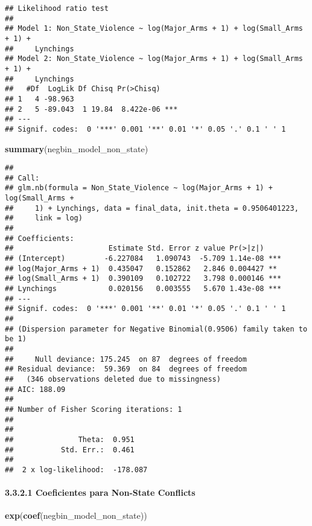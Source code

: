 \documentclass[
  11pt,
]{article}
\newenvironment{Shaded}{\begin{snugshade}}{\end{snugshade}}
\newcommand{\FunctionTok}[1]{\textcolor[rgb]{0.13,0.29,0.53}{\textbf{#1}}}
\newcommand{\NormalTok}[1]{#1}
\begin{document}
\begin{verbatim}
## Likelihood ratio test
## 
## Model 1: Non_State_Violence ~ log(Major_Arms + 1) + log(Small_Arms + 1) + 
##     Lynchings
## Model 2: Non_State_Violence ~ log(Major_Arms + 1) + log(Small_Arms + 1) + 
##     Lynchings
##   #Df  LogLik Df Chisq Pr(>Chisq)    
## 1   4 -98.963                        
## 2   5 -89.043  1 19.84  8.422e-06 ***
## ---
## Signif. codes:  0 '***' 0.001 '**' 0.01 '*' 0.05 '.' 0.1 ' ' 1
\end{verbatim}

\begin{Shaded}
\begin{Highlighting}[]
\FunctionTok{summary}\NormalTok{(negbin\_model\_non\_state)}
\end{Highlighting}
\end{Shaded}

\begin{verbatim}
## 
## Call:
## glm.nb(formula = Non_State_Violence ~ log(Major_Arms + 1) + log(Small_Arms + 
##     1) + Lynchings, data = final_data, init.theta = 0.9506401223, 
##     link = log)
## 
## Coefficients:
##                      Estimate Std. Error z value Pr(>|z|)    
## (Intercept)         -6.227084   1.090743  -5.709 1.14e-08 ***
## log(Major_Arms + 1)  0.435047   0.152862   2.846 0.004427 ** 
## log(Small_Arms + 1)  0.390109   0.102722   3.798 0.000146 ***
## Lynchings            0.020156   0.003555   5.670 1.43e-08 ***
## ---
## Signif. codes:  0 '***' 0.001 '**' 0.01 '*' 0.05 '.' 0.1 ' ' 1
## 
## (Dispersion parameter for Negative Binomial(0.9506) family taken to be 1)
## 
##     Null deviance: 175.245  on 87  degrees of freedom
## Residual deviance:  59.369  on 84  degrees of freedom
##   (346 observations deleted due to missingness)
## AIC: 188.09
## 
## Number of Fisher Scoring iterations: 1
## 
## 
##               Theta:  0.951 
##           Std. Err.:  0.461 
## 
##  2 x log-likelihood:  -178.087
\end{verbatim}

\paragraph{3.3.2.1 Coeficientes para Non-State
Conflicts}\label{coeficientes-para-non-state-conflicts}

\begin{Shaded}
\begin{Highlighting}[]
\FunctionTok{exp}\NormalTok{(}\FunctionTok{coef}\NormalTok{(negbin\_model\_non\_state))}
\end{Highlighting}
\end{Shaded}
\end{document}
